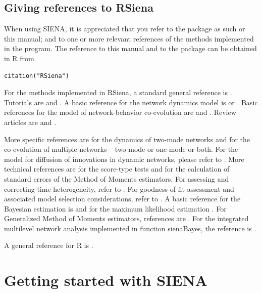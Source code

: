\documentclass[a4paper,fleqn,11pt]{article}
\newcommand{\+}{\, + \,}
\newcommand{\sfn}[1]{\textsf{#1}}
\newcommand{\R}{{\sf R }}
\newcommand{\rs}{{\sf RSiena}}
\newcommand{\SI}{{\sf SIENA }}
\newcommand{\si}{{\sf SIENA}}
\begin{document}
\newpage

\subsection{Giving references to RSiena}

When using \si, it is appreciated that you refer to the package as such
or this manual; and to one or
more relevant references of the methods implemented in the program.  The
reference to this manual and to the package can be obtained in \R from
\begin{verbatim}
citation("RSiena")
\end{verbatim}

For the methods implemented in \rs,
a standard general reference is \citet{Snijders2017}.
Tutorials are \citet*{SnijdersEA10b} and \citet{Kalish2020}.
A basic reference for the network dynamics model is \citet{Snijders01}
or \citet{Snijders05}.
Basic references for the model of network-behavior co-evolution
are \citet*{SnijdersEA07} and \citet*{SteglichEA10}.
Review articles are \citet{Snijders2017} and \citet{SnijdersPickup17}.

More specific references are \citet{KoskinenEdling2012} for the
dynamics of two-mode networks and \citet{SLT2013} for the
co-evolution of multiple networks -- two mode or one-mode or both.
For the model for diffusion of innovations in dynamic networks,
please refer to \citet{Greenan15}.
More technical references are
\citet{Schweinberger12} for the score-type tests
and \citet{SchweinbergerSnijders07a} for the calculation of
standard errors of the Method of Moments estimators.
For assessing and correcting time heterogeneity, refer to
\citet*{Lospinoso2011}.
For goodness of fit assessment and associated model
selection considerations, refer to \citet{LospinosoSnijders2019}.
A basic reference for the Bayesian estimation is \citet{KoskinenSnijders07}
and for the maximum likelihood estimation \citet*{SnijdersEA10a}.
For Generalized Method of Moments estimators,
references are \citet*{ASS2015,ASS2019}.
For the integrated multilevel network analysis implemented
in function \sfn{sienaBayes}, the reference is \citet{KoskinenSnijders2023}.
\smallskip

A general reference for \R is \citet{R}.


\newpage

\section{Getting started with \SI}
\label{S_minsi1}
\end{document}
